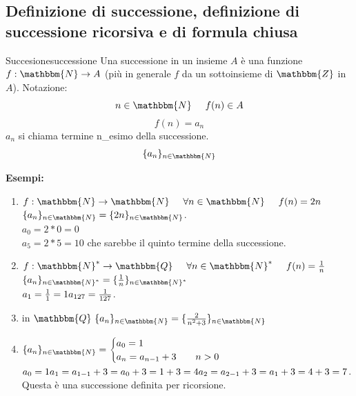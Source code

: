 \documentclass[12pt, letterpaper]{report}
\newcounter{definition}
\newcommand{\nmu}{}
\begin{document}
 		\subsection{Definizione di successione, definizione di successione ricorsiva e di formula chiusa}
 		\begin{definition}{\nmu Succesione}{successione}
 			Una successione in un insieme $A$ è una funzione $f: \mathbbm{N} \to A$ (più in generale $f$ da un sottoinsieme di $\mathbbm{Z}$ in $A$).
 			Notazione:
 			\[
 			n \in \mathbbm{N} \hspace{0.5cm} f(n) \in A
 			\]
 			\[
 			f(n) = a_n
 			\]
 			$a_n$ si chiama termine n\_esimo della successione.
 			\[
 			\{a_n\}_{n \in \mathbbm{N}}
 			\]
 		\end{definition}
 		\textbf{Esempi:}
 		\begin{enumerate}
 			\item $f: \mathbbm{N} \to \mathbbm{N} \hspace{0.5cm} \forall n \in \mathbbm{N} \hspace{0.5cm} f(n) = 2n$
 			\\
 			$\{a_n\}_{n \in \mathbbm{N}} = \{2n\}_{n \in \mathbbm{N}}$.
 			\\
 			$a_0 = 2 * 0 = 0$ \\
 			$a_5 = 2 * 5 = 10$ che sarebbe il quinto termine della successione. \item $f: \mathbbm{N}^* \to \mathbbm{Q} \hspace{0.5cm} \forall n \in \mathbbm{N}^* \hspace{0.5cm} f(n) = \frac{1}{n}$
 			\\
 			$\{a_n\}_{n \in \mathbbm{N}^*} = \{\frac{1}{n}\}_{n \in \mathbbm{N}^*}$
 			\\
 			$a_1 = \frac{1}{1} = 1 \\ a_{127} = \frac{1}{127}$.
 			\item in $\mathbbm{Q} \ \{a_n\}_{n \in \mathbbm{N}} = \{\frac{2}{n^2 + 3}\}_{n \in \mathbbm{N}}$
 			\item $\{a_n\}_{n \in \mathbbm{N}} = \begin{cases}
 				a_0 = 1 \\
 				a_n = a_{n - 1} + 3 \hspace{0.7cm} n > 0
 			\end{cases}$
 			\\
 			$a_0 = 1 \\ a_1 = a_{1 - 1} + 3 = a_0 + 3 = 1 + 3 = 4 \\ a_2 = a_{2 - 1} + 3 = a_1 + 3 = 4 + 3 = 7$. \\
 			Questa è una successione definita per ricorsione.
 		\end{enumerate}
\end{document}
